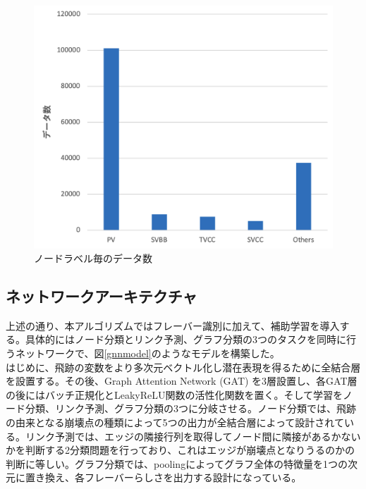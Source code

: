 \begin{figure}[H]
	\begin{center}
 \includegraphics[keepaspectratio, scale=0.3]
 	{Figure/Flavortagging/imbalance.png}
 		\caption{ノードラベル毎のデータ数}
 		\label{node_imb}
	\end{center}
\end{figure}
\subsection{ネットワークアーキテクチャ}
上述の通り、本アルゴリズムではフレーバー識別に加えて、補助学習を導入する。具体的にはノード分類とリンク予測、グラフ分類の3つのタスクを同時に行うネットワークで、図\ref{gnnmodel}のようなモデルを構築した。\\
はじめに、飛跡の変数をより多次元ベクトル化し潜在表現を得るために全結合層を設置する。その後、Graph Attention Network (GAT) を3層設置し、各GAT層の後にはバッチ正規化とLeakyReLU関数の活性化関数を置く。そして学習をノード分類、リンク予測、グラフ分類の3つに分岐させる。ノード分類では、飛跡の由来となる崩壊点の種類によって5つの出力が全結合層によって設計されている。リンク予測では、エッジの隣接行列を取得してノード間に隣接があるかないかを判断する2分類問題を行っており、これはエッジが崩壊点となりうるのかの判断に等しい。グラフ分類では、poolingによってグラフ全体の特徴量を1つの次元に置き換え、各フレーバーらしさを出力する設計になっている。

